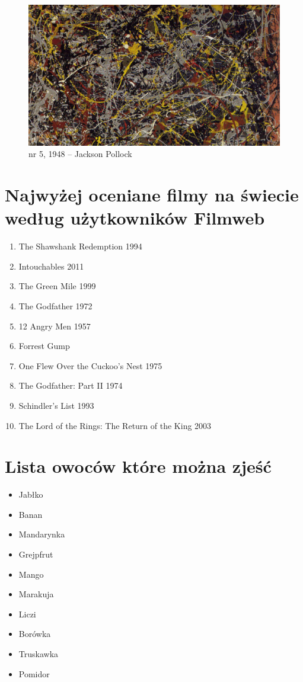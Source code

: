 \documentclass{article}
\begin{document}
\begin{figure}[h!]
\centering
\includegraphics[width=12cm, angle=180]{niktniezauwazyzejestdogorynogamii}
\caption{nr 5, 1948 – Jackson Pollock}
\label{fig:obrazek k}
\end{figure}

\newpage
\section{Najwyżej oceniane filmy na świecie według użytkowników Filmweb}

\begin{enumerate}
\large
  \item The Shawshank Redemption 1994
  \item Intouchables 2011
  \item The Green Mile 1999
  \item The Godfather 1972
  \item 12 Angry Men 1957
  \item Forrest Gump
  \item One Flew Over the Cuckoo's Nest 1975
  \item The Godfather: Part II 1974
  \item Schindler's List 1993
  \item The Lord of the Rings: The Return of the King 2003
\end{enumerate}

\section{Lista owoców które można zjeść}

\begin {itemize}
\large
  \item Jabłko \cite{brown2012apple}
  \item Banan \cite{seymour1993banana}
  \item Mandarynka \cite{sybesma2013mandarin}
  \item Grejpfrut \cite{bailey1998grapefruit}
  \item Mango \cite{mirta1997mango}
  \item Marakuja \cite{zibadi2004passion}
  \item Liczi \cite{menzel1987lychee}
  \item Borówka \cite{chu2011bilberry}
  \item Truskawka \cite{darrow1966strawberry}
  \item Pomidor \cite{just1980tomatoes}
\end {itemize}
\end{document}
